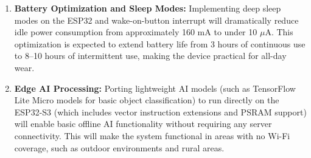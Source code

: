 \begin{enumerate}[leftmargin=1.5cm]
\item \textbf{Battery Optimization and Sleep Modes:} Implementing deep sleep modes on the ESP32 and wake-on-button interrupt will dramatically reduce idle power consumption from approximately 160 mA to under 10 $\mu$A. This optimization is expected to extend battery life from 3 hours of continuous use to 8--10 hours of intermittent use, making the device practical for all-day wear.

\item \textbf{Edge AI Processing:} Porting lightweight AI models (such as TensorFlow Lite Micro models for basic object classification) to run directly on the ESP32-S3 (which includes vector instruction extensions and PSRAM support) will enable basic offline AI functionality without requiring any server connectivity. This will make the system functional in areas with no Wi-Fi coverage, such as outdoor environments and rural areas.
\end{enumerate}

